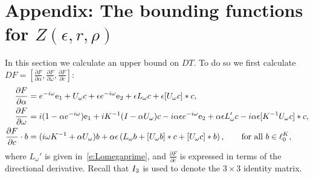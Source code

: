 

\section{Appendix: The bounding functions for $Z(\epsilon,r,\rho)$}
\label{sec:BoundingFunctions}

	In this section we calculate an upper bound on $DT$.  
	To do so we first calculate 
	\(
	DF = 
	\left[ \frac{\partial F}{\partial  \alpha}, 
	\frac{\partial F}{\partial  \omega},
	\frac{\partial F}{\partial  c}
	\right]
	\):
	\begin{alignat}{1}
	\label{eq:FpartialA}
	\frac{\partial F}{\partial  \alpha} &= e^{-i \omega} \mathrm{e}_1 + U_\omega c + \epsilon e^{-i \omega} \mathrm{e}_2 + \epsilon L_\omega c + \epsilon [ U_\omega c] * c , \\
	\label{eq:FpartialW} 
	\frac{\partial F}{\partial  \omega} &=
	i(1-\alpha e^{-i \omega}) \mathrm{e}_1 + 
	i K^{-1} ( I - \alpha U_{\omega} ) c  -
	i \alpha \epsilon e^{-i \omega} \mathrm{e}_2 + 
	\alpha \epsilon L_{\omega}' c - i \alpha \epsilon [ K^{-1} U_\omega c ] *c ,
	\\
	\frac{\partial F}{\partial  c} \cdot b 
	& =
	( i \omega K^{-1} + \alpha U_{\omega}) b + \alpha \epsilon \left( L_\omega b  + [ U_\omega b] * c + [U_{\omega} c ]*b \right)  , \qquad \text{for all $b\in \ell^K_0$},
	\label{eq:Fcderivative}
\end{alignat}	
where $L_{\omega}'$ is given in~\eqref{e:Lomegaprime}, and $\frac{\partial F}{\partial  c}$ is expressed in terms of the directional derivative. 
Recall that $I_3$ is used to denote the $ 3 \times 3$ identity matrix. 

%
%
%


